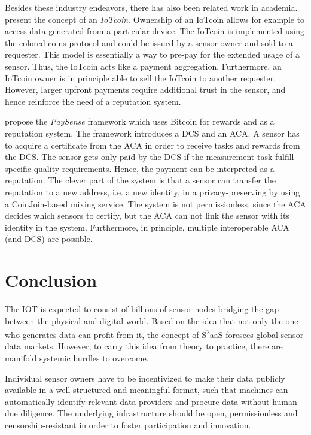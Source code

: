 Besides these industry endeavors, there has also been related work in academia. \cite{7073830} present the concept of an \emph{IoTcoin}. Ownership of an IoTcoin allows for example to access data generated from a particular device. The IoTcoin is implemented using the colored coins protocol and could be issued by a sensor owner and sold to a requester. This model is essentially a way to pre-pay for the extended usage of a sensor. Thus, the IoTcoin acts like a payment aggregation. Furthermore, an IoTcoin owner is in principle able to sell the IoTcoin to another requester. However, larger upfront payments require additional trust in the sensor, and hence reinforce the need of a reputation system.

\cite{s16060776} propose the \emph{PaySense} framework which uses Bitcoin for rewards and as a reputation system. The framework introduces a \ac{DCS} and an \ac{ACA}. A sensor has to acquire a certificate from the \ac{ACA} in order to receive tasks and rewards from the \ac{DCS}. The sensor gets only paid by the \ac{DCS} if the measurement task fulfill specific quality requirements. Hence, the payment can be interpreted as a reputation. The clever part of the system is that a sensor can transfer the reputation to a new address, i.e. a new identity, in a privacy-preserving by using a CoinJoin-based mixing service. The system is not permissionless, since the \ac{ACA} decides which sensors to certify, but the \ac{ACA} can not link the sensor with its identity in the system. Furthermore, in principle, multiple interoperable \ac{ACA} (and \ac{DCS}) are possible. 
 

\section{Conclusion}
\label{sec:s2aas_conclusion}

The \ac{IOT} is expected to consist of billions of sensor nodes bridging the gap between the physical and digital world. Based on the idea that not only the one who generates data can profit from it, the concept of S\textsuperscript{2}aaS foresees global sensor data markets. However, to carry this idea from theory to practice, there are manifold systemic hurdles to overcome.

Individual sensor owners have to be incentivized to make their data publicly available in a well-structured and meaningful format, such that machines can automatically identify relevant data providers and procure data without human due diligence. The underlying infrastructure should be open, permissionless and censorship-resistant in order to foster participation and innovation. 

